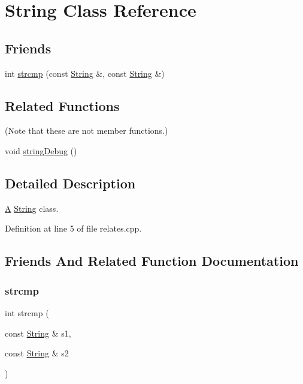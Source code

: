 \hypertarget{class_string}{}\section{String Class Reference}
\label{class_string}
\subsection*{Friends}
\begin{DoxyCompactItemize}
\item 
int \hyperlink{class_string_ae3c243f0bc797b9e4b15d2ef5e5aaa7c}{strcmp} (const \hyperlink{class_string}{String} \&, const \hyperlink{class_string}{String} \&)
\end{DoxyCompactItemize}
\subsection*{Related Functions}
(Note that these are not member functions.) \begin{DoxyCompactItemize}
\item 
void \hyperlink{class_string_a5c07384b505d25ae6f61fc7abf0b0e61}{string\+Debug} ()
\end{DoxyCompactItemize}


\subsection{Detailed Description}
\hyperlink{class_a}{A} \hyperlink{class_string}{String} class. 

Definition at line 5 of file relates.\+cpp.



\subsection{Friends And Related Function Documentation}
\mbox{\label{class_string_ae3c243f0bc797b9e4b15d2ef5e5aaa7c}} 
\subsubsection{\texorpdfstring{strcmp}{strcmp}}
{\footnotesize\ttfamily int strcmp (\begin{DoxyParamCaption}\item[{const \hyperlink{class_string}{String} \&}]{s1,  }\item[{const \hyperlink{class_string}{String} \&}]{s2 }\end{DoxyParamCaption})\hspace{0.3cm}{\ttfamily [friend]}}

